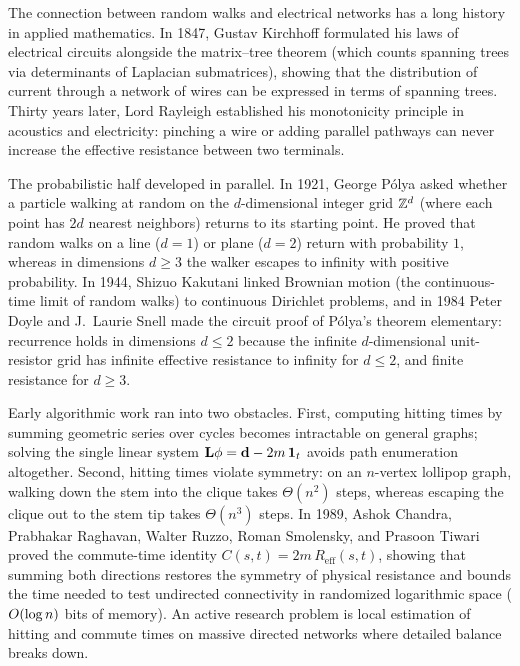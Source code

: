 \begin{historybox}
The connection between random walks and electrical networks has a long history in applied mathematics. In 1847, Gustav Kirchhoff formulated his laws of electrical circuits alongside the matrix--tree theorem (which counts spanning trees via determinants of Laplacian submatrices), showing that the distribution of current through a network of wires can be expressed in terms of spanning trees. Thirty years later, Lord Rayleigh established his monotonicity principle in acoustics and electricity: pinching a wire or adding parallel pathways can never increase the effective resistance between two terminals.

The probabilistic half developed in parallel. In 1921, George P\'olya asked whether a particle walking at random on the $d$-dimensional integer grid $\mathbb{Z}^d$ (where each point has $2d$ nearest neighbors) returns to its starting point. He proved that random walks on a line ($d=1$) or plane ($d=2$) return with probability $1$, whereas in dimensions $d\ge 3$ the walker escapes to infinity with positive probability. In 1944, Shizuo Kakutani linked Brownian motion (the continuous-time limit of random walks) to continuous Dirichlet problems, and in 1984 Peter Doyle and J.~Laurie Snell made the circuit proof of P\'olya's theorem elementary: recurrence holds in dimensions $d \le 2$ because the infinite $d$-dimensional unit-resistor grid has infinite effective resistance to infinity for $d\le 2$, and finite resistance for $d \ge 3$.

Early algorithmic work ran into two obstacles. First, computing hitting times by summing geometric series over cycles becomes intractable on general graphs; solving the single linear system $\mathbf{L} \phi = \mathbf{d}-2m\,\mathbf{1}_t$ avoids path enumeration altogether. Second, hitting times violate symmetry: on an $n$-vertex lollipop graph, walking down the stem into the clique takes $\Theta(n^2)$ steps, whereas escaping the clique out to the stem tip takes $\Theta(n^3)$ steps. In 1989, Ashok Chandra, Prabhakar Raghavan, Walter Ruzzo, Roman Smolensky, and Prasoon Tiwari proved the commute-time identity $C(s,t) = 2m\,R_{\mathrm{eff}}(s,t)$, showing that summing both directions restores the symmetry of physical resistance and bounds the time needed to test undirected connectivity in randomized logarithmic space ($O(\log n)$ bits of memory). An active research problem is local estimation of hitting and commute times on massive directed networks where detailed balance breaks down.
\end{historybox}

